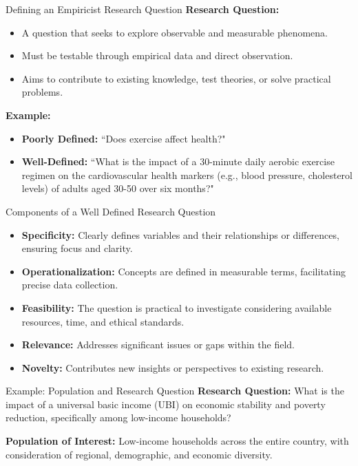 \documentclass[handout]{beamer} %
\begin{document}

\begin{frame}{Defining an Empiricist Research Question}
\textbf{Research Question:}
\begin{itemize}
    \item A question that seeks to explore observable and measurable phenomena.
    \item Must be testable through empirical data and direct observation.
    \item Aims to contribute to existing knowledge, test theories, or solve practical problems.
\end{itemize}
    \pause %
\textbf{Example:}
\begin{itemize}
    \item \textbf{Poorly Defined:} ``Does exercise affect health?"
    \item \textbf{Well-Defined:} ``What is the impact of a 30-minute daily aerobic exercise regimen on the cardiovascular health markers (e.g., blood pressure, cholesterol levels) of adults aged 30-50 over six months?"
\end{itemize}

\end{frame}

\begin{frame}{Components of a Well Defined Research Question}
\begin{itemize}
    \item \textbf{Specificity:} Clearly defines variables and their relationships or differences, ensuring focus and clarity.
    \item \textbf{Operationalization:} Concepts are defined in measurable terms, facilitating precise data collection.
    \item \textbf{Feasibility:} The question is practical to investigate considering available resources, time, and ethical standards.
    \item \textbf{Relevance:} Addresses significant issues or gaps within the field.
    \item \textbf{Novelty:} Contributes new insights or perspectives to existing research.
\end{itemize}


\end{frame}




\begin{frame}{Example: Population and Research Question}
\textcolor{moonstoneblue}{\textbf{Research Question:}} What is the impact of a universal basic income (UBI) on economic stability and poverty reduction, specifically among low-income households?

\vspace{0.5cm}

\textcolor{moonstoneblue}{\textbf{Population of Interest:}} Low-income households across the entire country, with consideration of regional, demographic, and economic diversity.

\end{frame}
\end{document}
